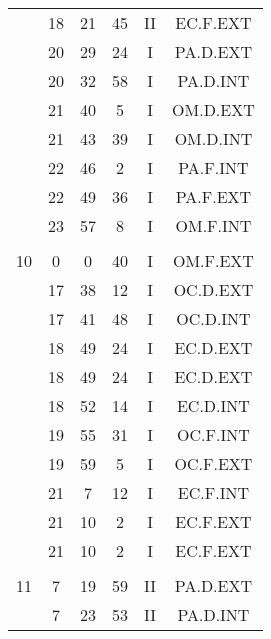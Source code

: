 \documentclass[12pt, a4paper]{article}
\begin{document}
\begin{multicols}{3}
{\begin{tabular}{c c c c c c}
	 	 	 	 & 18 & 21 & 45 & II & EC.F.EXT\\%
	 	 	 	 & 20 & 29 & 24 & I & PA.D.EXT\\%
	 	 	 	 & 20 & 32 & 58 & I & PA.D.INT\\%
	 	 	 	 & 21 & 40 & 5 & I & OM.D.EXT\\%
	 	 	 	 & 21 & 43 & 39 & I & OM.D.INT\\%
	 	 	 	 & 22 & 46 & 2 & I & PA.F.INT\\%
	 	 	 	 & 22 & 49 & 36 & I & PA.F.EXT\\%
	 	 	 	 & 23 & 57 & 8 & I & OM.F.INT\\%
	 	 	 	 & & & & & \\%
	 	 	 	10 & 0 & 0 & 40 & I & OM.F.EXT\\%
	 	 	 	 & 17 & 38 & 12 & I & OC.D.EXT\\%
	 	 	 	 & 17 & 41 & 48 & I & OC.D.INT\\%
	 	 	 	 & 18 & 49 & 24 & I & EC.D.EXT\\%
	 	 	 	 & 18 & 49 & 24 & I & EC.D.EXT\\%
	 	 	 	 & 18 & 52 & 14 & I & EC.D.INT\\%
	 	 	 	 & 19 & 55 & 31 & I & OC.F.INT\\%
	 	 	 	 & 19 & 59 & 5 & I & OC.F.EXT\\%
	 	 	 	 & 21 & 7 & 12 & I & EC.F.INT\\%
	 	 	 	 & 21 & 10 & 2 & I & EC.F.EXT\\%
	 	 	 	 & 21 & 10 & 2 & I & EC.F.EXT\\%
	 	 	 	 & & & & & \\%
	 	 	 	11 & 7 & 19 & 59 & II & PA.D.EXT\\%
	 	 	 	 & 7 & 23 & 53 & II & PA.D.INT\\%

\end{tabular}}
\end{multicols}
\end{document}
